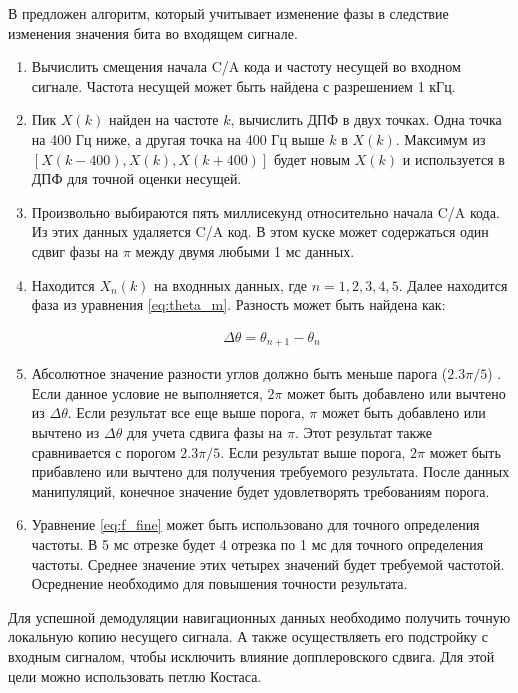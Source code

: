 В \cite{tsui} предложен алгоритм, который учитывает изменение фазы в следствие изменения значения бита во входящем сигнале.
\begin{enumerate}
\renewcommand{\labelenumi}{\arabic{enumi}.}
    \item Вычислить смещения начала C/A кода и частоту несущей во входном сигнале. Частота несущей может быть найдена с разрешением 1 кГц.
    \item Пик ${X(k)}$ найден на частоте ${k}$, вычислить ДПФ в двух точках. Одна точка на 400 Гц ниже, а другая точка на 400 Гц выше ${k}$ в ${X(k)}$.
    	  Максимум из ${[X(k-400), X(k), X(k+400)]}$ будет новым ${X(k)}$ и используется в ДПФ для точной оценки несущей.
    \item Произвольно выбираются пять миллисекунд относительно начала C/A кода. Из этих данных удаляется C/A код. В этом куске может
          содержаться один сдвиг фазы на ${\pi}$ между двумя любыми 1 мс данных.
    \item Находится ${X_n(k)}$ на входнных данных, где ${n = 1, 2, 3, 4, 5}$. Далее находится фаза из уравнения \ref{eq:theta_m}. Разность может
          быть найдена как:

	\begin{eqnarray}
	\Delta{\theta} = \theta_{n+1} - \theta_n
	\label{eq:Delta_phi}
	\end{eqnarray}

    \item Абсолютное значение разности углов должно быть меньше парога (${2.3\pi/5}$) \cite{tsui}. Если данное условие не выполняется, ${2\pi}$
          может быть добавлено или вычтено из ${\Delta{\theta}}$. Если результат все еще выше порога, ${\pi}$ может быть добавлено или вычтено
	  из ${\Delta{\theta}}$ для учета сдвига фазы на ${\pi}$. Этот результат также сравнивается с порогом ${2.3\pi/5}$. Если результат выше
	  порога, ${2\pi}$ может быть прибавлено или вычтено для получения требуемого результата. После данных манипуляций, конечное значение будет
	  удовлетворять требованиям порога.
    \item Уравнение \ref{eq:f_fine} может быть использовано для точного определения частоты. В 5 мс отрезке будет 4 отрезка по 1 мс для точного
          определения частоты. Среднее значение этих четырех значений будет требуемой частотой. Осреднение необходимо для повышения точности результата.
\end{enumerate}


Для успешной демодуляции навигационных данных необходимо получить точную локальную копию несущего сигнала. А
также осуществляеть его подстройку с входным сигналом, чтобы исключить влияние допплеровского сдвига. Для этой 
цели можно использовать петлю Костаса.


